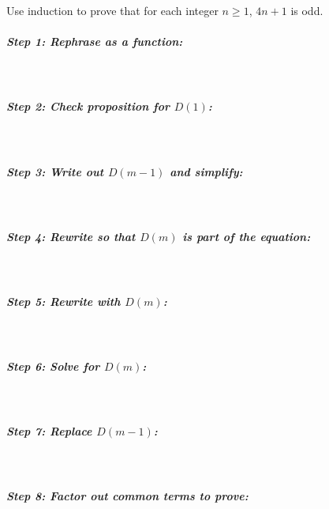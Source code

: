 \documentclass[a4paper,12pt]{book}
\newcounter{question}
\begin{document}
        \begin{questionNOGRADE}{\thequestion}
            Use induction to prove that for each integer $n \geq 1$, $4n+1$ is odd.

            \subparagraph{Step 1: Rephrase as a function:} ~\\
            
            \subparagraph{Step 2: Check proposition for $D(1)$:} ~\\

            \subparagraph{Step 3: Write out $D(m-1)$ and simplify:} ~\\

            \subparagraph{Step 4: Rewrite so that $D(m)$ is part of the equation:} ~\\

            \subparagraph{Step 5: Rewrite with $D(m)$:}~\\

            \subparagraph{Step 6: Solve for $D(m)$:}~\\

            \subparagraph{Step 7: Replace $D(m-1)$:}~\\

            \subparagraph{Step 8: Factor out common terms to prove:}~\\
        \end{questionNOGRADE}
\end{document}
